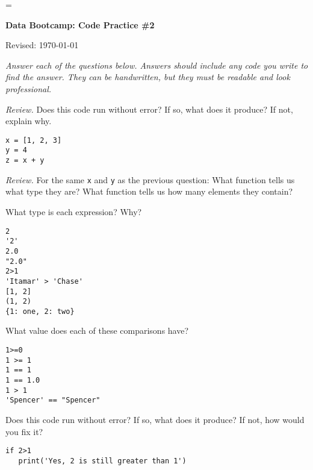 \documentclass[11pt]{exam}
\begin{document}
\parskip=\bigskipamount
\parindent=0.0in
\thispagestyle{empty}


\bigskip\bigskip
\centerline{\Large \bf Data Bootcamp:  Code Practice \#2}
\centerline{Revised: \today}

{\it Answer each of the questions below.
Answers should include any code you write to find the answer.
They can be handwritten, but they must be readable and look professional.}
\begin{questions}

\item {\it Review.\/} Does this code run without error? If so, what does it produce?  If not, explain why. 
\begin{verbatim}
x = [1, 2, 3]
y = 4
z = x + y
\end{verbatim}

\item {\it Review.\/} For the same {\tt x} and {\tt y} as the previous question:
What function tells us what type they are?
What function tells us how many elements they contain?  



\item What type is each expression?  Why?
\begin{verbatim}
2 
'2'
2.0
"2.0"
2>1
'Itamar' > 'Chase' 
[1, 2]
(1, 2)
{1: one, 2: two} 
\end{verbatim}

\item What value does each of these comparisons have?  
\begin{verbatim}
1>=0 
1 >= 1 
1 == 1
1 == 1.0
1 > 1 
'Spencer' == "Spencer"
\end{verbatim}

\item  Does this code run without error?  If so, what does it produce?  If not, how would you fix it?
\begin{verbatim}
if 2>1
   print('Yes, 2 is still greater than 1')
\end{verbatim}


\end{questions}
\end{document}
